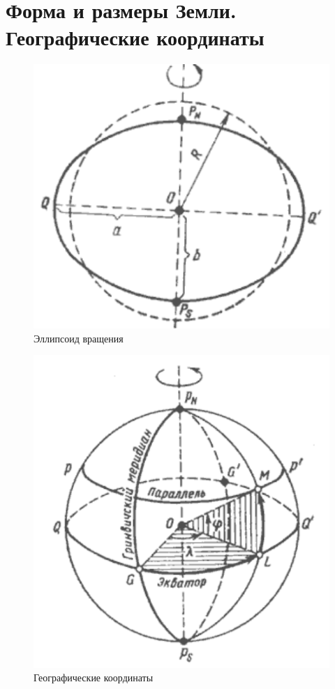 \documentclass[a4paper, 12pt, twoside, final, book, russian, fittopage, cyremdash]{ncc}
\begin{document}
\section{Форма и размеры Земли. Географические координаты} 

\begin{figure}[htb]
  \centering{}
  \includegraphics{N001}
  \caption{Эллипсоид вращения}
  \label{fig:N1}
\end{figure}

\begin{figure}[htb]
  \centering{}
  \includegraphics{N002}
  \caption{Географические координаты}
  \label{fig:N2}
\end{figure}
\end{document}
